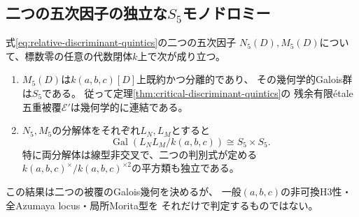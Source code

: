 \subsection{二つの五次因子の独立な\texorpdfstring{$S_5$}{S5}モノドロミー}
\begin{theorem}
\label{thm:paired-quintic-S5}
式\eqref{eq:relative-discriminant-quintics}の二つの五次因子
$N_5(D),M_5(D)$について、標数零の任意の代数閉体$k$上で次が成り立つ。
\begin{enumerate}
\item $M_5(D)$は$k(a,b,c)[D]$上既約かつ分離的であり、
その幾何学的Galois群は$S_5$である。
従って定理\ref{thm:critical-discriminant-quintics}の
残余有限\'{e}tale五重被覆$\mathcal E'$は幾何学的に連結である。
\item $N_5,M_5$の分解体をそれぞれ$L_N,L_M$とすると
\[
 \operatorname{Gal}(L_NL_M/k(a,b,c))\cong S_5\times S_5.
\]
特に両分解体は線型非交叉で、二つの判別式が定める
$k(a,b,c)^\times/k(a,b,c)^{\times2}$の平方類も独立である。
\end{enumerate}
この結果は二つの被覆のGalois幾何を決めるが、
一般$(a,b,c)$の非可換H3性・全Azumaya locus・局所Morita型を
それだけで判定するものではない。
\end{theorem}
